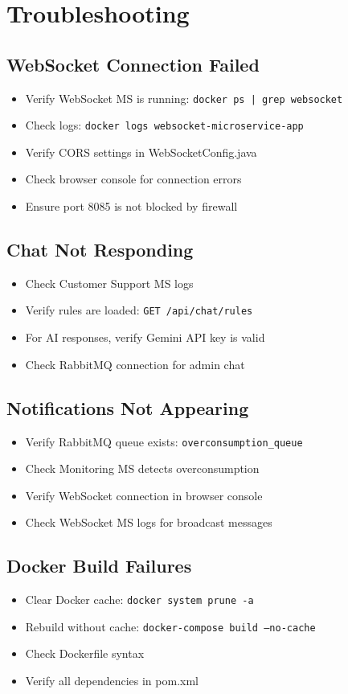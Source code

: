 \documentclass[12pt,a4paper]{article}
\begin{document}
\section{Troubleshooting}

\subsection{WebSocket Connection Failed}
\begin{itemize}
    \item Verify WebSocket MS is running: \texttt{docker ps | grep websocket}
    \item Check logs: \texttt{docker logs websocket-microservice-app}
    \item Verify CORS settings in WebSocketConfig.java
    \item Check browser console for connection errors
    \item Ensure port 8085 is not blocked by firewall
\end{itemize}

\subsection{Chat Not Responding}
\begin{itemize}
    \item Check Customer Support MS logs
    \item Verify rules are loaded: \texttt{GET /api/chat/rules}
    \item For AI responses, verify Gemini API key is valid
    \item Check RabbitMQ connection for admin chat
\end{itemize}

\subsection{Notifications Not Appearing}
\begin{itemize}
    \item Verify RabbitMQ queue exists: \texttt{overconsumption\_queue}
    \item Check Monitoring MS detects overconsumption
    \item Verify WebSocket connection in browser console
    \item Check WebSocket MS logs for broadcast messages
\end{itemize}

\subsection{Docker Build Failures}
\begin{itemize}
    \item Clear Docker cache: \texttt{docker system prune -a}
    \item Rebuild without cache: \texttt{docker-compose build --no-cache}
    \item Check Dockerfile syntax
    \item Verify all dependencies in pom.xml
\end{itemize}
\end{document}
